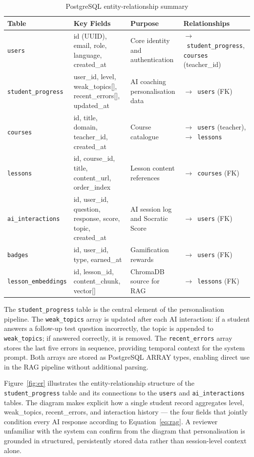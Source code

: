 \documentclass[12pt,a4paper]{report}
\newcommand{\rar}{$\rightarrow$}
\begin{document}
\begin{table}[htbp]
\centering
\caption{PostgreSQL entity-relationship summary}
\label{tab:er}
\footnotesize
\renewcommand{\arraystretch}{1.3}
\begin{tabularx}{\textwidth}{L{2.7cm} L{3.6cm} L{3.0cm} X}
\toprule
\textbf{Table} & \textbf{Key Fields} & \textbf{Purpose} & \textbf{Relationships}\\
\midrule
\texttt{users} & id (UUID), email, role, language, created\_at & Core identity and
authentication & \rar\ \texttt{student\_progress}, \texttt{courses} (teacher\_id)\\
\texttt{student\_progress} & user\_id, level, weak\_topics[], recent\_errors[],
updated\_at & AI coaching personalisation data & \rar\ \texttt{users} (FK)\\
\texttt{courses} & id, title, domain, teacher\_id, created\_at & Course catalogue &
\rar\ \texttt{users} (teacher), \rar\ \texttt{lessons}\\
\texttt{lessons} & id, course\_id, title, content\_url, order\_index & Lesson content
references & \rar\ \texttt{courses} (FK)\\
\texttt{ai\_interactions} & id, user\_id, question, response, score, topic, created\_at &
AI session log and Socratic Score & \rar\ \texttt{users} (FK)\\
\texttt{badges} & id, user\_id, type, earned\_at & Gamification rewards &
\rar\ \texttt{users} (FK)\\
\texttt{lesson\_embeddings} & id, lesson\_id, content\_chunk, vector[] & ChromaDB source
for RAG & \rar\ \texttt{lessons} (FK)\\
\bottomrule
\end{tabularx}
\end{table}

The \texttt{student\_progress} table is the central element of the personalisation
pipeline. The \texttt{weak\_topics} array is updated after each AI interaction: if a
student answers a follow-up test question incorrectly, the topic is appended to
\texttt{weak\_topics}; if answered correctly, it is removed. The \texttt{recent\_errors}
array stores the last five errors in sequence, providing temporal context for the system
prompt. Both arrays are stored as PostgreSQL ARRAY types, enabling direct use in the RAG
pipeline without additional parsing.

Figure~\ref{fig:er} illustrates the entity-relationship structure of the
\texttt{student\_progress} table and its connections to the \texttt{users} and
\texttt{ai\_interactions} tables. The diagram makes explicit how a single student record
aggregates level, weak\_topics, recent\_errors, and interaction history --- the four
fields that jointly condition every AI response according to Equation~\ref{eq:rag}. A
reviewer unfamiliar with the system can confirm from the diagram that personalisation is
grounded in structured, persistently stored data rather than session-level context alone.
\end{document}
